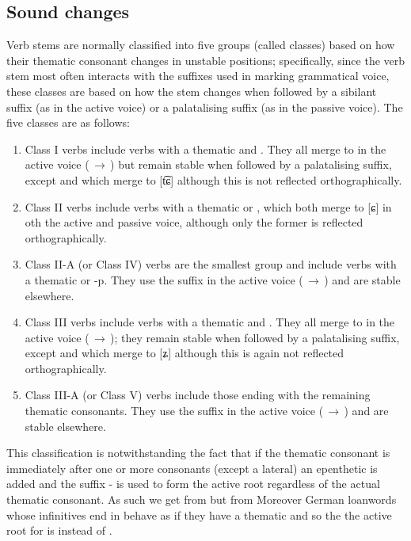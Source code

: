 \subsection{Sound changes}
Verb stems are normally classified into five groups (called {\cscaps classes}) based on how their thematic consonant changes in unstable positions; specifically, since the verb stem most often interacts with the suffixes used in marking grammatical voice, these classes are based on how the stem changes when followed by a sibilant suffix (as in the active voice) or a palatalising suffix (as in the passive voice). The five classes are as follows: 
\begin{enumerate}[nosep]
	\item Class I verbs include verbs with a thematic  and . They all merge to  in the active voice (\,$\rightarrow$\,) but remain stable when followed by a palatalising suffix, except  and  which merge to [t͡ɕ] although this is not reflected orthographically.
	\item Class II verbs include verbs with a thematic  or , which both merge to [ɕ] in oth the active and passive voice, although only the former is reflected orthographically. 
	\item Class II-A (or Class IV) verbs are the smallest group and include verbs with a thematic  or {-p}. They use the suffix  in the active voice (\,$\rightarrow$\,) and are stable elsewhere.
	\item Class III verbs include verbs with a thematic  and . They all merge to  in the active voice (\,$\rightarrow$\,); they remain stable when followed by a palatalising suffix, except  and  which merge to [ʑ] although this is again not reflected orthographically.
	\item Class III-A (or Class V) verbs include those ending with the remaining thematic consonants. They use the suffix  in the active voice (\,$\rightarrow$\,) and are stable elsewhere.
\end{enumerate}

This classification is notwithstanding the fact that if the thematic consonant is immediately after one or more consonants (except a lateral) an epenthetic  is added and the suffix - is used to form the active root regardless of the actual thematic consonant. As such we get  from  but  from  Moreover German loanwords whose infinitives end in  behave as if they have a thematic  and so the the active root for  is  instead of .

